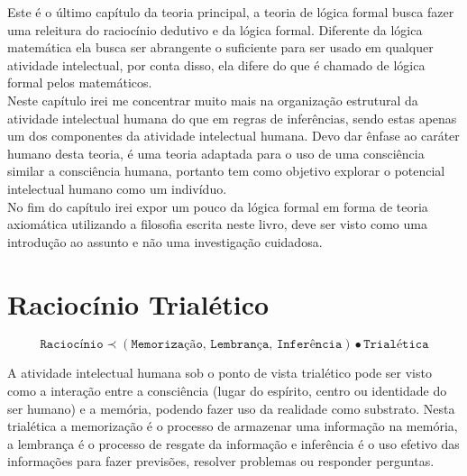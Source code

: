 \documentclass[10pt,a4paper]{report}
\begin{document}
Este é o último capítulo da teoria principal, a teoria de lógica formal busca fazer uma releitura do raciocínio dedutivo e da lógica formal. Diferente da lógica matemática ela busca ser abrangente o suficiente para ser usado em qualquer atividade intelectual, por conta disso, ela difere do que é chamado de lógica formal pelos matemáticos. \\

Neste capítulo irei me concentrar muito mais na organização estrutural da atividade intelectual humana do que em regras de inferências, sendo estas apenas um dos componentes da atividade intelectual humana. Devo dar ênfase ao caráter humano desta teoria, é uma teoria adaptada para o uso de uma consciência similar a consciência humana, portanto tem como objetivo explorar o potencial intelectual humano como um indivíduo.\\

No fim do capítulo irei expor um pouco da lógica formal em forma de teoria axiomática utilizando a filosofia escrita neste livro, deve ser visto como uma introdução ao assunto e não uma investigação cuidadosa.




\section{Raciocínio Trialético}


$$ \texttt{Raciocínio} \prec ( \texttt{Memorização, Lembrança, Inferência} ) \bullet \texttt{Trialética} $$

A atividade intelectual humana sob o ponto de vista trialético pode ser visto como a interação entre a consciência (lugar do espírito, centro ou identidade do ser humano) e a memória, podendo fazer uso da realidade como substrato. Nesta trialética a memorização é o processo de armazenar uma informação na memória, a lembrança é o processo de resgate da informação e inferência é o uso efetivo das informações para fazer previsões, resolver problemas ou responder perguntas.\\
\end{document}
